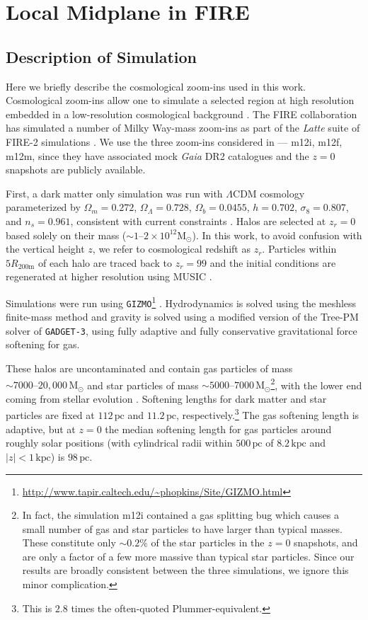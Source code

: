 \documentclass[twocolumn]{aastex62}
\newcommand{\Msun}{\text{M}_\odot}
\newcommand{\pc}{\text{pc}}
\newcommand{\kpc}{\text{kpc}}
\newcommand{\abs}[1]{\left| #1 \right|}
\newcommand{\z}{z_r}
\begin{document}
\section{Local Midplane in FIRE} \label{sec:local_fire}
\subsection{Description of Simulation} \label{ssec:cosmozoom}
Here we briefly describe the cosmological zoom-ins used in this work.
Cosmological zoom-ins allow one to simulate a selected region at high
resolution embedded in a low-resolution cosmological background
\citep[e.g.][]{1993ApJ...412..455K,2014MNRAS.437.1894O}. The FIRE
collaboration has simulated a number of Milky Way-mass zoom-ins as part of the
{\em Latte} suite of FIRE-2 simulations
\citep{2016ApJ...827L..23W,2018MNRAS.481.4133G}. We use the three zoom-ins
considered in \citet{2018arXiv180610564S} --- m12i, m12f, m12m, since they
have associated mock {\em Gaia} DR2 catalogues and the $z=0$ snapshots are
publicly available.

First, a dark matter only simulation was run with $\Lambda$CDM cosmology
parameterized by $\Omega_m = 0.272$, $\Omega_{\Lambda} = 0.728$, $\Omega_b =
0.0455$, $h = 0.702$, $\sigma_8 = 0.807$, and $n_s = 0.961$, consistent with
current constraints \citep{2018arXiv180706209P}. Halos are selected at $\z=0$
based solely on their mass ($\sim 1\text{--}2 \times 10^{12} \Msun$). In this
work, to avoid confusion with the vertical height $z$, we refer to
cosmological redshift as $\z$. Particles within $5 R_{200\text{m}}$ of each
halo are traced back to $\z=99$ and the initial conditions are regenerated at
higher resolution using MUSIC \citep{2011MNRAS.415.2101H}.

Simulations were run using
\texttt{GIZMO}\footnote{\url{http://www.tapir.caltech.edu/~phopkins/Site/GIZMO.html}}
\citep{2015MNRAS.450...53H}. Hydrodynamics is solved using the meshless
finite-mass method and gravity is solved using a modified version of the
Tree-PM solver of \texttt{GADGET-3}, using fully adaptive and fully
conservative gravitational force softening for gas.

These halos are uncontaminated and contain gas particles of mass $\sim 7000
\text{--} 20,000\,\Msun$ and star particles of mass $\sim 5000 \text{--} 7000\,
\Msun$\footnote{In fact, the simulation m12i contained a gas
splitting bug which causes a small number of gas and star particles to have
larger than typical masses. These constitute only $\sim0.2\%$ of the star
particles in the $z=0$ snapshots, and are only a factor of a few more massive
than typical star particles. Since our results are broadly consistent between
the three simulations, we ignore this minor complication.}, with the lower end
coming from stellar evolution \citep{2018arXiv180610564S}. Softening lengths
for dark matter and star particles are fixed at $112\,\pc$ and $11.2\,\pc$,
respectively.\footnote{This is $2.8$ times the often-quoted
Plummer-equivalent.} The gas softening length is adaptive, but at $z=0$ the
median softening length for gas particles around roughly solar positions (with
cylindrical radii within $500\,\pc$ of $8.2\,\kpc$ and $\abs{z}<1\,\kpc$) is
$98\,\pc$.
\end{document}

